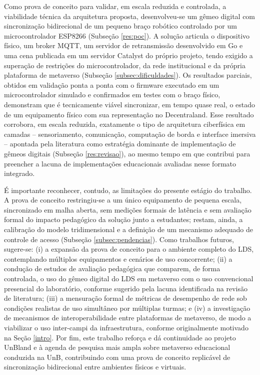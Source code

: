 \documentclass[12pt]{article}
\begin{document}
Como prova de conceito para validar, em escala reduzida e controlada, a viabilidade técnica da arquitetura proposta, desenvolveu-se um gêmeo digital com sincronização bidirecional de um pequeno braço robótico controlado por um microcontrolador ESP8266 (Subseção \ref{res:poc}). A solução articula o dispositivo físico, um broker MQTT, um servidor de retransmissão desenvolvido em Go e uma cena publicada em um servidor Catalyst do próprio projeto, tendo exigido a superação de restrições do microcontrolador, da rede institucional e da própria plataforma de metaverso (Subseção \ref{subsec:dificuldades}). Os resultados parciais, obtidos em validação ponta a ponta com o firmware executado em um microcontrolador simulado e confirmados em testes com o braço físico, demonstram que é tecnicamente viável sincronizar, em tempo quase real, o estado de um equipamento físico com sua representação no Decentraland. Esse resultado corrobora, em escala reduzida, exatamente o tipo de arquitetura ciberfísica em camadas -- sensoriamento, comunicação, computação de borda e interface imersiva -- apontada pela literatura como estratégia dominante de implementação de gêmeos digitais (Subseção \ref{res:revisao}), ao mesmo tempo em que contribui para preencher a lacuna de implementações educacionais avaliadas nesse formato integrado.
 
É importante reconhecer, contudo, as limitações do presente estágio do trabalho. A prova de conceito restringiu-se a um único equipamento de pequena escala, sincronizado em malha aberta, sem medições formais de latência e sem avaliação formal do impacto pedagógico da solução junto a estudantes; restam, ainda, a calibração do modelo tridimensional e a definição de um mecanismo adequado de controle de acesso (Subseção \ref{subsec:pendencias}). Como trabalhos futuros, sugere-se: (i) a expansão da prova de conceito para o ambiente completo do LDS, contemplando múltiplos equipamentos e cenários de uso concorrente; (ii) a condução de estudos de avaliação pedagógica que comparem, de forma controlada, o uso do gêmeo digital do LDS em metaverso com o uso convencional presencial do laboratório, conforme sugerido pela lacuna identificada na revisão de literatura; (iii) a mensuração formal de métricas de desempenho de rede sob condições realistas de uso simultâneo por múltiplas turmas; e (iv) a investigação de mecanismos de interoperabilidade entre plataformas de metaverso, de modo a viabilizar o uso inter-campi da infraestrutura, conforme originalmente motivado na Seção \ref{intro}. Por fim, este trabalho reforça e dá continuidade ao projeto UnBland e à agenda de pesquisa mais ampla sobre metaverso educacional conduzida na UnB, contribuindo com uma prova de conceito replicável de sincronização bidirecional entre ambientes físicos e virtuais.

\newpage
 
\end{document}

